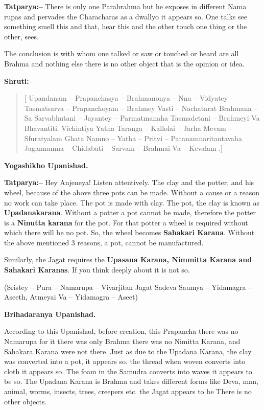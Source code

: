 \textbf{Tatparya:–} There is only one Parabrahma but he exposes in different Nama rupas and pervades the Characharas as a dwallyo it appears so. One talks see something smell this and that, hear this and the other touch one thing or the other, sees.

The conclusion is with whom one talked or saw or touched or heard are all Brahma and nothing else there is no other object that is the opinion or idea.

\textbf{Shruti:–}

\begin{verse}
[ Upandanam – Prapanchasya – Brahmanonya – Nna – Vidyatey – Tasmatsarva – Prapanchoyam – Brahmey Vasti – Nachatarat  Brahmana – Sa Sarvabhutani – Jayantey – Parmatmanaha  Tasmadetani – Brahmeyi Va Bhavantiti. Vichintiya  Yatha Taranga – Kallolai – Jarha Mevam – Sfuratyalam  Ghata Namno – Yatha – Pritvi – Patanamnaritantavaha  Jagannamna – Chidabati – Sarvam – Brahmai Va – Kevalam .]
\end{verse}

\begin{flushright}
\textbf{Yogashikho Upanishad.}
\end{flushright}

\textbf{Tatparya:–} Hey Anjeneya! Listen attentively. The clay and the potter, and his wheel, because of the above three pots can be made. Without a cause or a reason no work can take place. The pot is made with clay. The pot, the clay is known as \textbf{Upadanakarana}. Without a potter a pot cannot be made, therefore the potter is a \textbf{Ninutta karana} for the pot. For that potter a wheel is required without which there will be no pot. So, the wheel becomes \textbf{Sahakari Karana}. Without the above mentioned 3 reasons, a pot, cannot be manufactured.

Similarly, the Jagat requires the \textbf{Upasana Karana, Nimmitta Karana and Sahakari Karanas}. If you think deeply about it is not so.

(Sristey – Pura – Namarupa – Vivarjitan Jagat  Sadeva Saumya – Yidamagra – Aseeth, Atmeyai Va – Yidamagra – Aseet)

\begin{flushright}
\textbf{Brihadaranya Upanishad.}
\end{flushright}

According to this Upanishad, before creation, this Prapancha there was no Namarupa for it there was only Brahma there was no Nimitta Karana, and Sahakara Karana were not there. Just as due to the Upadana Karana, the clay was converted into a pot, it appears so. the thread when woven converts into cloth it appears so. The foam in the Samudra converts into waves it appears to be so. The Upadana Karana is Brahma and takes different forms like Deva, man, animal, worms, insects, trees, creepers etc. the Jagat appears to be There is no other objects.

